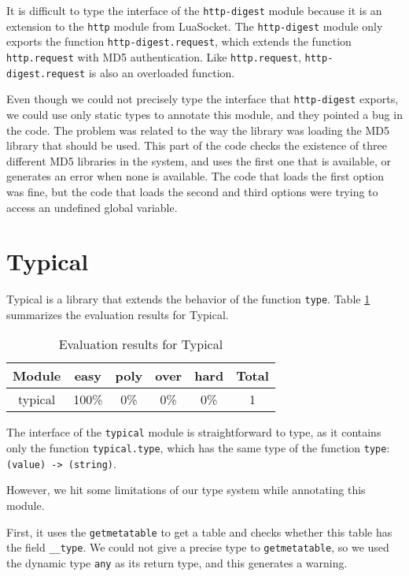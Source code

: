 It is difficult to type the interface of the \texttt{http-digest} module
because it is an extension to the \texttt{http} module from LuaSocket.
The \texttt{http-digest} module only exports the function
\texttt{http-digest.request}, which extends the function
\texttt{http.request} with MD5 authentication.
Like \texttt{http.request}, \texttt{http-digest.request}
is also an overloaded function.

Even though we could not precisely type the interface that \texttt{http-digest}
exports, we could use only static types to annotate this module,
and they pointed a bug in the code.
The problem was related to the way the library was loading the MD5 library
that should be used. 
This part of the code checks the existence of three different MD5 libraries
in the system, and uses the first one that is available, or generates an
error when none is available.
The code that loads the first option was fine, but the code that loads the
second and third options were trying to access an undefined global variable.

\section{Typical}

Typical is a library that extends the behavior of the function \texttt{type}. 
Table \ref{tab:evaltypical} summarizes the evaluation results for Typical.

\begin{table}[!ht]
\begin{center}
\begin{tabular}{|c|c|c|c|c|c|}
\hline
\textbf{Module} & \textbf{easy} & \textbf{poly} & \textbf{over} & \textbf{hard} & \textbf{Total} \\
\hline
typical & 100\% & 0\% & 0\% & 0\% & 1 \\ %
\hline
\end{tabular}
\end{center}
\caption{Evaluation results for Typical}
\label{tab:evaltypical}
\end{table}

The interface of the \texttt{typical} module is straightforward to type,
as it contains only the function \texttt{typical.type},
which has the same type of the function \texttt{type}: \texttt{(value) -> (string)}.

However, we hit some limitations of our type system while annotating this module.

First, it uses the \texttt{getmetatable} to get a table and
checks whether this table has the field \texttt{\string_\string_type}.
We could not give a precise type to \texttt{getmetatable}, so we used the dynamic
type \texttt{any} as its return type, and this generates a warning.

